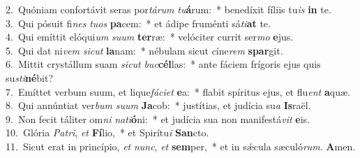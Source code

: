 {2.~}Quóniam confortávit seras por\textit{tá}\textit{rum} \textit{tu}\textbf{á}rum:~* benedíxit fíliis tu\textit{is} \textbf{in} te.\\
{3.~}Qui pósuit fi\textit{nes} \textit{tu}\textit{os} \textbf{pa}cem:~* et ádipe fruménti sá\textit{ti}\textbf{at} te.\\
{4.~}Qui emíttit elóqui\textit{um} \textit{su}\textit{um} \textbf{ter}ræ:~* velóciter currit ser\textit{mo} \textbf{e}jus.\\
{5.~}Qui dat ni\textit{vem} \textit{si}\textit{cut} \textbf{la}nam:~* nébulam sicut cíne\textit{rem} \textbf{spar}git.\\
{6.~}Mittit crystállum suam \textit{si}\textit{cut} \textit{buc}\textbf{cél}las:~* ante fáciem frígoris ejus quis su\textit{sti}\textbf{né}bit?\\
{7.~}Emíttet verbum suum, et lique\textit{fá}\textit{ci}\textit{et} \textbf{e}a:~* flabit spíritus ejus, et flu\textit{ent} \textbf{a}quæ.\\
{8.~}Qui annúntiat ver\textit{bum} \textit{su}\textit{um} \textbf{Ja}cob:~* justítias, et judícia su\textit{a} \textbf{Is}raël.\\
{9.~}Non fecit táliter om\textit{ni} \textit{na}\textit{ti}\textbf{ó}ni:~* et judícia sua non manifestá\textit{vit} \textbf{e}is.\\
{10.~}Glória \textit{Pa}\textit{tri}, \textit{et} \textbf{Fí}lio,~* et Spirítu\textit{i} \textbf{San}cto.\\
{11.~}Sicut erat in princípio, \textit{et} \textit{nunc}, \textit{et} \textbf{sem}per,~* et in sǽcula sæculó\textit{rum}. \textbf{A}men.\\
